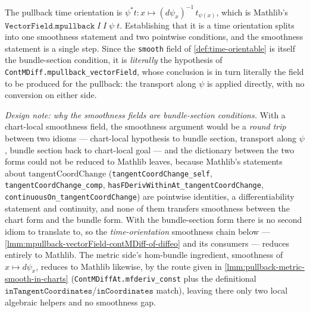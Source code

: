 The pullback time orientation is $\psi^*t : x \mapsto (d\psi_x)^{-1}\,t_{\psi(x)}$, which is Mathlib's $\mathtt{VectorField.mpullback}\;I\;I\;\psi\;t$. Establishing that it is a time orientation splits into one smoothness statement and two pointwise conditions, and the smoothness statement is a single step. Since the \texttt{smooth} field of \ref{def:time-orientable} is itself the bundle-section condition, it is \emph{literally} the hypothesis of \texttt{ContMDiff.mpullback\_vectorField}, whose conclusion is in turn literally the field to be produced for the pullback: the transport along $\psi$ is applied directly, with no conversion on either side.

\emph{Design note: why the smoothness fields are bundle-section conditions.} With a chart-local smoothness field, the smoothness argument would be a \emph{round trip} between two idioms --- chart-local hypothesis to bundle section, transport along $\psi$, bundle section back to chart-local goal --- and the dictionary between the two forms could not be reduced to Mathlib leaves, because Mathlib's statements about $\mathrm{tangentCoordChange}$ (\texttt{tangentCoordChange\_self}, \texttt{tangentCoordChange\_comp}, \texttt{hasFDerivWithinAt\_tangentCoordChange}, \texttt{continuousOn\_tangentCoordChange}) are pointwise identities, a differentiability statement and continuity, and none of them transfers smoothness between the chart form and the bundle form. With the bundle-section form there is no second idiom to translate to, so the \emph{time-orientation} smoothness chain below --- \ref{lmm:mpullback-vectorField-contMDiff-of-diffeo} and its consumers --- reduces entirely to Mathlib. The metric side's hom-bundle ingredient, smoothness of $x \mapsto d\psi_x$, reduces to Mathlib likewise, by the route given in \ref{lmm:pullback-metric-smooth-in-charts} (\texttt{ContMDiffAt.mfderiv\_const} plus the definitional $\mathtt{inTangentCoordinates}$/$\mathtt{inCoordinates}$ match), leaving there only two local algebraic helpers and no smoothness gap.

